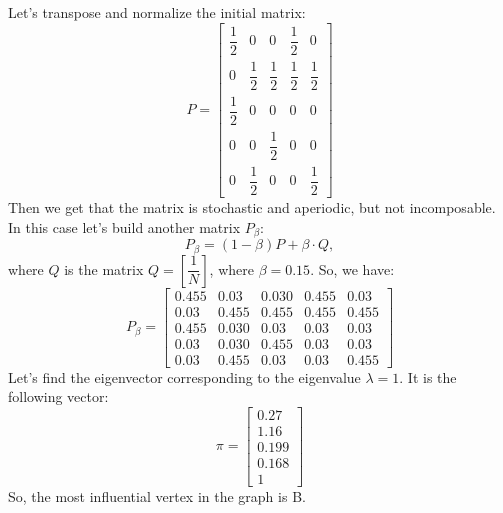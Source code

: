 \documentclass[12pt]{report}
\begin{document}
\begin{solution}
    Let's transpose and normalize the initial matrix:
    \[
         P = \begin{bmatrix}
            \dfrac{1}{2}  &  0  &  0  &  \dfrac{1}{2}  &  0 \\[0.5cm]
            0  &  \dfrac{1}{2}  &  \dfrac{1}{2} &  \dfrac{1}{2}  &  \dfrac{1}{2} \\[0.5cm]
            \dfrac{1}{2}  &  0  &  0  &  0  &  0 \\[0.5cm]
            0  &  0  &  \dfrac{1}{2}  &  0  &  0 \\[0.5cm]
            0  &  \dfrac{1}{2}  &  0  &  0  &  \dfrac{1}{2} 
          \end{bmatrix}
    \]
    Then we get that the matrix is stochastic and aperiodic, but not incomposable. In this case let's build another matrix $P_\beta$:
    \[
          P_\beta = (1- \beta) P + \beta \cdot Q,
    \]
    where $Q$ is the matrix $Q = \left[\dfrac{1}{N}\right]$, where $\beta = 0.15$. So, we have:
    \[
         P_\beta = \begin{bmatrix}
            0.455 &  0.03 &  0.030 &  0.455 &  0.03\\
            0.03 &  0.455 &  0.455 &  0.455 &  0.455\\
            0.455 &  0.030 &  0.03 &  0.03 &  0.03\\
            0.03 &  0.030 &  0.455 &  0.03 &  0.03\\
            0.03 &  0.455 &  0.03 &  0.03 &  0.455
          \end{bmatrix}
    \]
    Let's find the eigenvector corresponding to the eigenvalue $\lambda = 1$. It is the following vector: 
    \[
          \pi = \begin{bmatrix}
            0.27 \\ 
            1.16 \\
            0.199\\
            0.168 \\
            1
          \end{bmatrix}
    \]
    So, the most influential vertex in the graph is B.
\end{solution}
\end{document}
